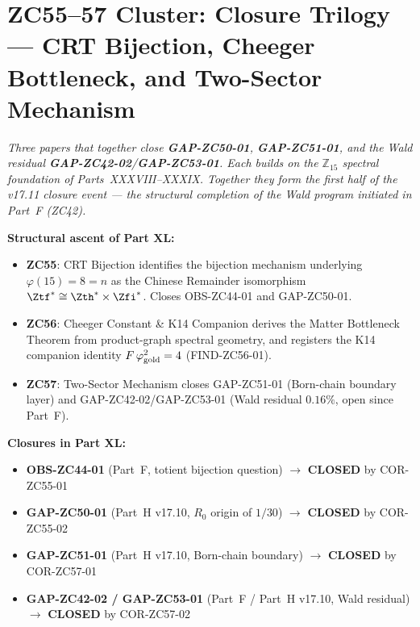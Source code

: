 \documentclass[12pt, a4paper]{article}
\begin{document}
\part{ZC55--57 Cluster: Closure Trilogy --- CRT Bijection,
      Cheeger Bottleneck, and Two-Sector Mechanism}
\label{part:zc55-57}

\noindent
\textit{Three papers that together close \textbf{GAP-ZC50-01},
\textbf{GAP-ZC51-01}, and the Wald residual
\textbf{GAP-ZC42-02}/\textbf{GAP-ZC53-01}. Each builds on the
$\mathbb{Z}_{15}$ spectral foundation of Parts~XXXVIII--XXXIX.
Together they form the first half of the v17.11 closure event ---
the structural completion of the Wald program initiated in
Part~F (ZC42).}

\medskip
\textbf{Structural ascent of Part XL:}
\begin{itemize}[leftmargin=1.5em]
\item \textbf{ZC55}: CRT Bijection identifies the bijection mechanism
  underlying $\varphi(15)=8=n$ as the Chinese Remainder isomorphism
  $\Ztf^{*}\cong\Zth^{*}\times\Zfi^{*}$. Closes OBS-ZC44-01 and
  GAP-ZC50-01.
\item \textbf{ZC56}: Cheeger Constant \& K14 Companion derives the
  Matter Bottleneck Theorem from product-graph spectral geometry,
  and registers the K14 companion identity
  $F\,\varphi_{\rm gold}^{2}=4$ (FIND-ZC56-01).
\item \textbf{ZC57}: Two-Sector Mechanism closes GAP-ZC51-01
  (Born-chain boundary layer) and GAP-ZC42-02/GAP-ZC53-01 (Wald
  residual $0.16\%$, open since Part~F).
\end{itemize}

\medskip
\textbf{Closures in Part XL:}
\begin{itemize}[leftmargin=1.5em]
\item \textbf{OBS-ZC44-01} (Part~F, totient bijection question)
  $\to$ \textbf{CLOSED} by COR-ZC55-01
\item \textbf{GAP-ZC50-01} (Part~H v17.10, $R_0$ origin of $1/30$)
  $\to$ \textbf{CLOSED} by COR-ZC55-02
\item \textbf{GAP-ZC51-01} (Part~H v17.10, Born-chain boundary)
  $\to$ \textbf{CLOSED} by COR-ZC57-01
\item \textbf{GAP-ZC42-02 / GAP-ZC53-01} (Part~F / Part~H v17.10,
  Wald residual) $\to$ \textbf{CLOSED} by COR-ZC57-02
\end{itemize}

\bigskip

\end{document}
